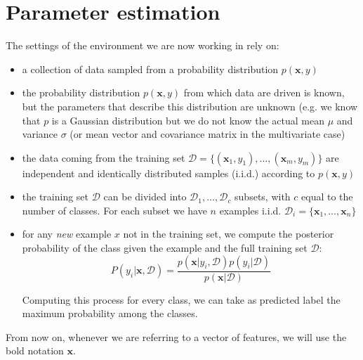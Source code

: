 \chapter{Parameter estimation}

\label{cha:param_estimation}

The settings of the environment we are now working in rely on:
\begin{itemize}
	\item a collection of data sampled from a probability distribution $p(\pmb{x},
		y)$

	\item the probability distribution $p(\pmb{x}, y)$ from which data are driven is
		known, but the parameters that describe this distribution are unknown (e.g.
		we know that $p$ is a Gaussian distribution but we do not know the actual
		mean $\mu$ and variance $\sigma$ (or mean vector and covariance matrix in the
		multivariate case)

	\item the data coming from the training set $\mathcal{D}= \{(\pmb{x}_{1}, y_{1}
		), \dots, (\pmb{x}_{m}, y_{m})\}$ are independent and identically distributed
		samples (i.i.d.) according to $p(\pmb{x}, y)$

	\item the training set $\mathcal{D}$ can be divided into $\mathcal{D}_{1}, \dots
		, \mathcal{D}_{c}$ subsets, with $c$ equal to the number of classes. For each
		subset we have $n$ examples i.i.d.
		$\mathcal{D}_{i}= \{\pmb{x}_{1}, \dots, \pmb{x}_{n}\}$

	\item for any \textit{new} example $x$ not in the training set, we compute the
		posterior probability of the class given the example and the full training set
		$\mathcal{D}$:
		\begin{equation}
			P(y_{i}|\pmb{x}, \mathcal{D}) = \frac{p(\pmb{x}|y_{i}, \mathcal{D})p(y_{i}|\mathcal{D})}{p(\pmb{x}|\mathcal{D})}
			\label{eq:main_eq}
		\end{equation}

		Computing this process for every class, we can take as predicted label the
		maximum probability among the classes.
\end{itemize}


From now on, whenever we are referring to a vector of features, we will use the bold
notation $\pmb{x}$.

